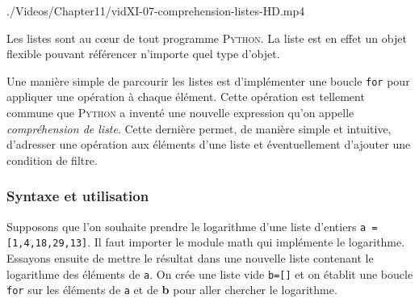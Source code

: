 \begin{marginvideo}
		{./Videos/Chapter11/vidXI-07-comprehension-listes-HD.mp4}%
\end{marginvideo}

Les listes sont au cœur de tout programme \textsc{Python}. La liste est en effet un objet flexible pouvant référencer n'importe quel type d'objet. 

Une manière simple de parcourir les listes est d'implémenter une boucle \texttt{for} pour appliquer une opération à chaque élément. Cette opération est tellement commune que \textsc{Python} a inventé une nouvelle expression qu'on appelle \emph{compréhension de liste}. Cette dernière permet, de manière simple et intuitive, d'adresser une opération aux éléments d'une liste et éventuellement d'ajouter une condition de filtre.

\subsubsection[Syntaxe et utilisation]{Syntaxe et utilisation}
\label{subsub:XI.4.1.1}

Supposons que l'on souhaite prendre le logarithme d'une liste d'entiers \texttt{a = [1,4,18,29,13]}. Il faut importer le module math qui implémente le logarithme. Essayons ensuite de mettre le résultat dans une nouvelle liste contenant le logarithme des éléments de \texttt{a}. On crée une liste vide \texttt{b=[]} et on établit une boucle \texttt{for} sur les éléments de \texttt{a} et de \textbf{b} pour aller chercher le logarithme.

